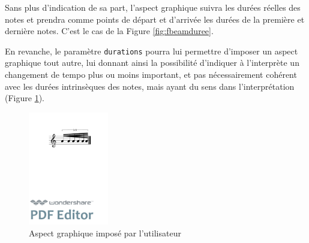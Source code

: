 \documentclass{article}
\newenvironment{gmncode}	{\vspace{-2mm}\small\verbatim}{\endverbatim\vspace{-2mm}}
\newcommand{\code}[1]		{{\small \texttt{#1}}}
\begin{document}
Sans plus d'indication de sa part, l'aspect graphique suivra les durées réelles des notes et prendra comme points de départ et d'arrivée les durées de la première et dernière notes.  C'est le cas de la Figure \ref{fig:fbeamduree}.

En revanche, le paramètre \code{durations} pourra lui permettre d'imposer un aspect graphique tout autre, lui donnant ainsi la possibilité d'indiquer à l'interprète un changement de tempo plus ou moins important, et pas nécessairement cohérent avec les durées intrinsèques des notes, mais ayant du sens dans l'interprétation (Figure \ref{fig:utilisateur}).

\begin{figure}[h]
\centering
\begin{gmncode}
[ 
  \fBeam<durations="1/16,1/64", 
  drawDuration="true">
   (a/8 a/16 a a a/32 a) 
]
\end{gmncode}

\includegraphics[width=35mm]{img/durations.pdf}
\caption{Aspect graphique imposé par l'utilisateur}
\label{fig:utilisateur}
\end{figure}
\end{document}

